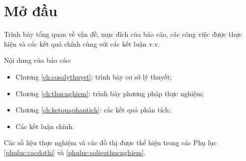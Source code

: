 \chapter*{Mở đầu}

Trình bày tổng quan về vấn đề, mục đích của báo cáo, các công việc được thực hiện và các kết quả chính cùng với các kết luận v.v. 

Nội dung của báo cáo: 

\begin{itemize}
\item Chương \ref{ch:cosolythuyet}: trình bày cơ sở lý thuyết;%

\item Chương \ref{ch:thucnghiem}: trình bày phương pháp thực nghiệm;

\item Chương \ref{ch:ketquaphantich}: các kết quả phân tích;

\item Các kết luận chính.%
\end{itemize}

Các số liệu thực nghiệm và các đồ thị được thể hiện trong các Phụ lục \ref{phuluc:cacdothi} và \ref{phuluc:solieuthucnghiem}.